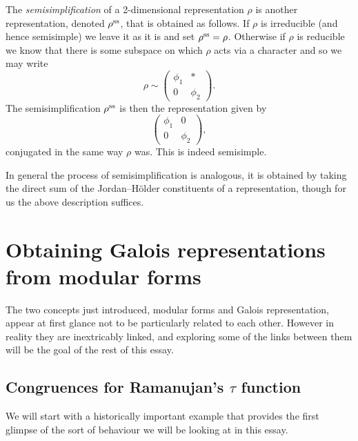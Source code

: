 \documentclass[a4paper,12pt]{article}
\begin{document}
\begin{defn}\label{def:semisimp}
The \emph{semisimplification} of a 2-dimensional representation $\rho$ is another representation, denoted $\rho^\text{ss}$, that is obtained as follows.
If $\rho$ is irreducible (and hence semisimple) we leave it as it is and set $\rho^\text{ss} = \rho$.
Otherwise if $\rho$ is reducible we know that there is some subspace on which $\rho$ acts via a character and so we may write
\[
\rho \sim
\begin{pmatrix}
\phi_1 & * \\
0      & \phi_2
\end{pmatrix}.
\]
The semisimplification $\rho^\text{ss}$ is then the representation given by
\[
\begin{pmatrix}
\phi_1 & 0 \\
0      & \phi_2
\end{pmatrix},
\]
conjugated in the same way $\rho$ was.
This is indeed semisimple.

In general the process of semisimplification is analogous, it is obtained by taking the direct sum of the Jordan--H\"older constituents of a representation, though for us the above description suffices.
\end{defn}



\section{Obtaining Galois representations from modular forms}
The two concepts just introduced, modular forms and Galois representation, appear at first glance not to be particularly related to each other.
However in reality they are inextricably linked, and exploring some of the links between them will be the goal of the rest of this essay.

\subsection{Congruences for Ramanujan's $\tau$ function}
We will start with a historically important example that provides the first glimpse of the sort of behaviour we will be looking at in this essay.
\end{document}
